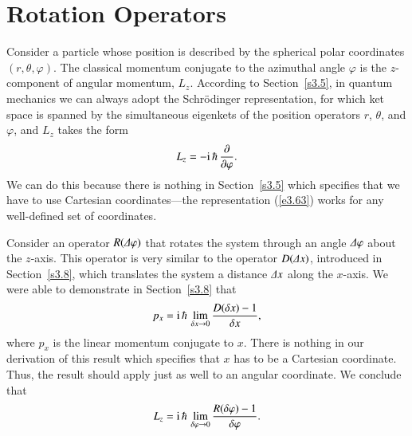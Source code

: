\section{Rotation Operators}\label{s5.3}
Consider a particle whose position is described by the spherical polar coordinates
$(r, \theta, \varphi)$. The classical momentum conjugate to the azimuthal
angle $\varphi$ is the $z$-component of angular momentum, $L_z$. 
According to Section~\ref{s3.5}, in quantum mechanics we can always adopt the Schr\"{o}dinger 
representation, for  which ket space is spanned by the simultaneous eigenkets
of the position operators $r$, $\theta$, and $\varphi$, and $L_z$ takes the
form
\begin{equation}\label{e5.45}
L_z = -{\rm i}\,\hbar\, \frac{\partial}{\partial \varphi}.
\end{equation}
We can do this because there is nothing in Section~\ref{s3.5} which specifies that
we have to use  Cartesian coordinates---the representation (\ref{e3.63}) works for 
any well-defined set of coordinates. 

Consider an operator $R({\mit\Delta}\varphi)$ that rotates the system through an angle
${\mit\Delta}\varphi$ about the $z$-axis. This operator is very similar to the
operator $D({\mit\Delta} x)$, introduced in Section~\ref{s3.8}, which translates the system
a distance ${\mit\Delta} x$ along the $x$-axis. 
We were able to demonstrate in Section~\ref{s3.8}
that
\begin{equation}
p_x = {\rm i}\,\hbar\, \lim_{\delta x\rightarrow 0}\frac{D(\delta x)-1}
{\delta x},
\end{equation}
where $p_x$ is the linear momentum conjugate to $x$. There is nothing
in our derivation of this result which specifies that $x$ has to be a Cartesian
coordinate. Thus, the result should apply just as well to an angular
coordinate. We conclude that
\begin{equation}\label{e5.47}
L_z = {\rm i}\,\hbar\, \lim_{\delta \varphi\rightarrow 0}\frac{R(\delta \varphi)-1}
{\delta \varphi}.
\end{equation}

